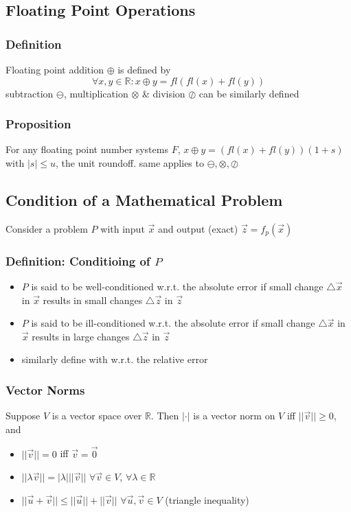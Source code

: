 \documentclass[11pt]{article}
\newcommand{\R}{{\mathbb{R}}}
\newcommand{\tri}{\triangle}
\begin{document}
\subsection{Floating Point Operations}
\subsubsection{Definition}
Floating point addition $\oplus$ is defined by \[\forall x,y\in\R: x\oplus y = fl(fl(x)+fl(y))\]
subtraction $\ominus$, multiplication $\otimes$ \& division $\oslash$ can be similarly defined 
\subsubsection{Proposition}
For any floating point number systems $F$, $x\oplus y=(fl(x)+fl(y))(1+s)$ with $|s|\leq u$, the unit roundoff. same applies to $\ominus, \otimes, \oslash$
\subsection{Condition of a Mathematical Problem}
Consider a problem $P$ with input $\vec{x}$ and output (exact) $\vec{z}=f_p(\vec{x})$
\subsubsection{Definition: Conditioing of $P$}
\begin{itemize}
  \item $P$ is said to be well-conditioned w.r.t. the absolute error if small change $\tri\vec{x}$ in $\vec{x}$ results in small changes $\tri\vec{z}$ in $\vec{z}$
  \item $P$ is said to be ill-conditioned w.r.t. the absolute error if small change $\tri\vec{x}$ in $\vec{x}$ results in large changes $\tri\vec{z}$ in $\vec{z}$
  \item similarly define with w.r.t. the relative error 
\end{itemize}
\subsubsection{Vector Norms}
Suppose $V$ is a vector space over $\R$. Then $|\cdot|$ is a vector norm on $V$ iff $||\vec{v}||\geq0$, and 
\begin{itemize}
  \item $||\vec{v}||=0$ iff $\vec{v} = \vec{0}$
  \item $||\lambda\vec{v}|| = |\lambda|||\vec{v}||$ $\forall\vec{v}\in V$, $\forall\lambda\in\R$
  \item $||\vec{u}+\vec{v}||\leq||\vec{u}||+||\vec{v}||$ $\forall\vec{u},\vec{v}\in V$ (triangle inequality)
\end{itemize}
\end{document}
